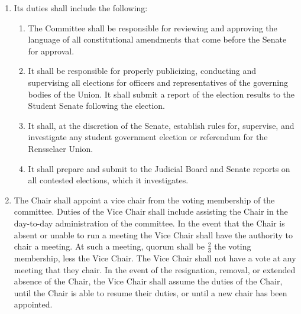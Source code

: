 \begin{enumerate}
\item Its duties shall include the following:
\begin{enumerate}
\item The Committee shall be responsible for reviewing and approving the language of all constitutional amendments that
come before the Senate for approval.
\item It shall be responsible for properly publicizing, conducting and supervising all elections for officers and
representatives of the governing bodies of the Union. It shall submit a report of the election results to the Student
Senate following the election.
\item It shall, at the discretion of the Senate, establish rules for, supervise, and investigate any student government election or referendum for the Rensselaer Union.
\item It shall prepare and submit to the Judicial Board and Senate reports on all contested elections, which it investigates.
\end{enumerate}

\item The Chair shall appoint a vice chair from the voting membership of the committee. Duties of the Vice Chair shall include
assisting the Chair in the day-to-day administration of the committee. In the event that the Chair is absent or unable to run a
meeting the Vice Chair shall have the authority to chair a meeting. At such a meeting, quorum shall be $\frac{2}{3}$ the voting
membership, less the Vice Chair. The Vice Chair shall not have a vote at any meeting that they chair. In the event of the
resignation, removal, or extended absence of the Chair, the Vice Chair shall assume the duties of the Chair, until the Chair
is able to resume their duties, or until a new chair has been appointed.
\end{enumerate}
